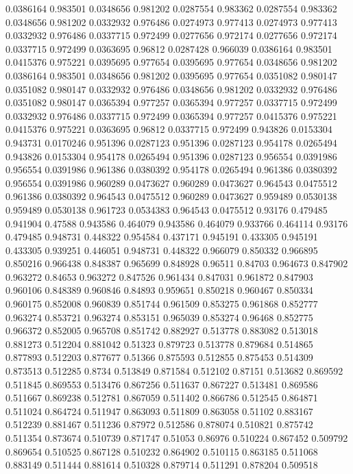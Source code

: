 0.0386164 0.983501
0.0348656 0.981202
0.0287554 0.983362
0.0287554 0.983362
0.0348656 0.981202
0.0332932 0.976486
0.0274973 0.977413
0.0274973 0.977413
0.0332932 0.976486
0.0337715 0.972499
0.0277656 0.972174
0.0277656 0.972174
0.0337715 0.972499
0.0363695 0.96812
0.0287428 0.966039
0.0386164 0.983501
0.0415376 0.975221
0.0395695 0.977654
0.0395695 0.977654
0.0348656 0.981202
0.0386164 0.983501
0.0348656 0.981202
0.0395695 0.977654
0.0351082 0.980147
0.0351082 0.980147
0.0332932 0.976486
0.0348656 0.981202
0.0332932 0.976486
0.0351082 0.980147
0.0365394 0.977257
0.0365394 0.977257
0.0337715 0.972499
0.0332932 0.976486
0.0337715 0.972499
0.0365394 0.977257
0.0415376 0.975221
0.0415376 0.975221
0.0363695 0.96812
0.0337715 0.972499
0.943826 0.0153304
0.943731 0.0170246
0.951396 0.0287123
0.951396 0.0287123
0.954178 0.0265494
0.943826 0.0153304
0.954178 0.0265494
0.951396 0.0287123
0.956554 0.0391986
0.956554 0.0391986
0.961386 0.0380392
0.954178 0.0265494
0.961386 0.0380392
0.956554 0.0391986
0.960289 0.0473627
0.960289 0.0473627
0.964543 0.0475512
0.961386 0.0380392
0.964543 0.0475512
0.960289 0.0473627
0.959489 0.0530138
0.959489 0.0530138
0.961723 0.0534383
0.964543 0.0475512
0.93176 0.479485
0.941904 0.47588
0.943586 0.464079
0.943586 0.464079
0.933766 0.464114
0.93176 0.479485
0.948731 0.448322
0.954584 0.437171
0.945191 0.433305
0.945191 0.433305
0.939251 0.446051
0.948731 0.448322
0.966079 0.850332
0.966895 0.850216
0.966438 0.848387
0.965699 0.848928
0.96511 0.84703
0.964673 0.847902
0.963272 0.84653
0.963272 0.847526
0.961434 0.847031
0.961872 0.847903
0.960106 0.848389
0.960846 0.84893
0.959651 0.850218
0.960467 0.850334
0.960175 0.852008
0.960839 0.851744
0.961509 0.853275
0.961868 0.852777
0.963274 0.853721
0.963274 0.853151
0.965039 0.853274
0.96468 0.852775
0.966372 0.852005
0.965708 0.851742
0.882927 0.513778
0.883082 0.513018
0.881273 0.512204
0.881042 0.51323
0.879723 0.513778
0.879684 0.514865
0.877893 0.512203
0.877677 0.51366
0.875593 0.512855
0.875453 0.514309
0.873513 0.512285
0.8734 0.513849
0.871584 0.512102
0.87151 0.513682
0.869592 0.511845
0.869553 0.513476
0.867256 0.511637
0.867227 0.513481
0.869586 0.511667
0.869238 0.512781
0.867059 0.511402
0.866786 0.512545
0.864871 0.511024
0.864724 0.511947
0.863093 0.511809
0.863058 0.51102
0.883167 0.512239
0.881467 0.511236
0.87972 0.512586
0.878074 0.510821
0.875742 0.511354
0.873674 0.510739
0.871747 0.51053
0.86976 0.510224
0.867452 0.509792
0.869654 0.510525
0.867128 0.510232
0.864902 0.510115
0.863185 0.511068
0.883149 0.511444
0.881614 0.510328
0.879714 0.511291
0.878204 0.509518
